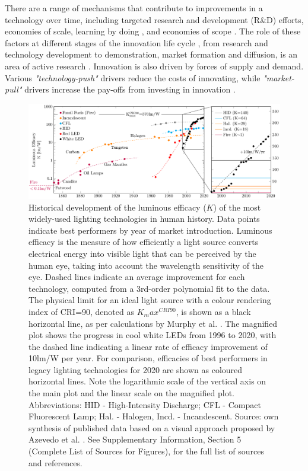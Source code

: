 \documentclass[twoside,twocolumn,9pt]{article}
\begin{document}
There are a range of mechanisms that contribute to improvements in a technology over time, including targeted research and development (R\&D) efforts, economies of scale, learning by doing \cite{Arrow1971}, and economies of scope \cite{johansson2012global}\cite{national2016power}\cite{iea2020perspectives}. The role of these factors at different stages of the innovation life cycle \cite{ grubler2012policies}, from research and technology development to demonstration, market formation and diffusion, is an area of active research \cite{Mowery1979} \cite{kavlak2018evaluating} \cite{Ziegler2021}. Innovation is also driven by forces of supply and demand. Various \textit{"technology-push"} drivers reduce the costs of innovating, while \textit{"market-pull"} drivers increase the pay-offs from investing in innovation \cite{anadon2009policy}.

\begin{figure}[h]
 \centering
 \includegraphics[width=\textwidth]{2_SSL_EES/article/figures/history_efficacy.pdf}
 \caption{Historical development of the luminous efficacy ($K$) of the most widely-used lighting technologies in human history. Data points indicate best performers by year of market introduction. Luminous efficacy is the measure of how efficiently a light source converts electrical energy into visible light that can be perceived by the human eye, taking into account the wavelength sensitivity of the eye. Dashed lines indicate an average improvement for each technology, computed from a 3rd-order polynomial fit to the data. The physical limit for an ideal light source with a colour rendering index of CRI=90, denoted as $K_max^{CRI90}$, is shown as a black horizontal line, as per calculations by Murphy et al. \cite{Murphy2012}. The magnified plot shows the progress in cool white LEDs from 1996 to 2020, with the dashed line indicating a linear rate of efficacy improvement of 10lm/W per year. For comparison, efficacies of best performers in legacy lighting technologies for 2020 are shown as coloured horizontal lines. Note the logarithmic scale of the vertical axis on the main plot and the linear scale on the magnified plot. Abbreviations: HID - High-Intensity Discharge; CFL - Compact Fluorescent Lamp; Hal. - Halogen, Incd. - Incandescent. Source: own synthesis of published data based on a visual approach proposed by Azevedo et al. \cite{azevedo2009transition}. See Supplementary Information, Section 5 (Complete List of Sources for Figures), for the full list of sources and references.}
 \label{fgr:history_efficacy}
\end{figure}
 
\end{document}
